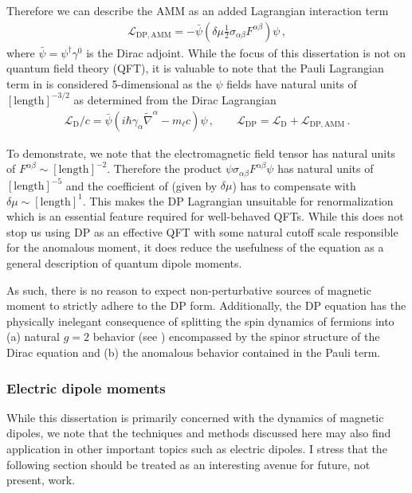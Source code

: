 Therefore we can describe the AMM as an added Lagrangian interaction term
\begin{gather}
    \label{lamm:1}
    \mathcal{L}_\mathrm{DP,AMM} = -{\bar\psi}\left(\delta\mu\frac{1}{2}\sigma_{\alpha\beta}F^{\alpha\beta}\right)\psi\,,
\end{gather}
where ${\bar\psi}=\psi^{\dagger}\gamma^{0}$ is the Dirac adjoint. While the focus of this dissertation is not on quantum field theory (QFT), it is valuable to note that the Pauli Lagrangian term in  is considered 5-dimensional as the $\psi$ fields have natural units of $[\mathrm{length}]^{-3/2}$ as determined from the Dirac Lagrangian
\begin{gather}
    \label{ld:1}
    \mathcal{L}_\mathrm{D}/c=\bar\psi\left(i\hbar\gamma_{\alpha}\widetilde\nabla^{\alpha}-m_{\ell}c\right)\psi\,,\qquad \mathcal{L}_\mathrm{DP} = \mathcal{L}_\mathrm{D} + \mathcal{L}_\mathrm{DP,AMM}\,.
\end{gather}

To demonstrate, we note that the electromagnetic field tensor has natural units of $F^{\alpha\beta}\sim[\mathrm{length}]^{-2}$. Therefore the product $\psi\sigma_{\alpha\beta}F^{\alpha\beta}\psi$ has natural units of $[\mathrm{length}]^{-5}$ and the coefficient of  (given by $\delta\mu$) has to compensate with $\delta\mu\sim[\mathrm{length}]^{1}$. This makes the DP Lagrangian unsuitable for renormalization which is an essential feature required for well-behaved QFTs. While this does not stop us using DP as an effective QFT with some natural cutoff scale responsible for the anomalous moment, it does reduce the usefulness of the equation as a general description of quantum dipole moments.

As such, there is no reason to expect non-perturbative sources of magnetic moment to strictly adhere to the DP form. Additionally, the DP equation has the physically inelegant consequence of splitting the spin dynamics of fermions into (a) natural $g\!=\!2$ behavior (see ) encompassed by the spinor structure of the Dirac equation and (b) the anomalous behavior contained in the Pauli term.

\subsubsection{Electric dipole moments}
\label{sec:edm}
\noindent While this dissertation is primarily concerned with the dynamics of magnetic dipoles, we note that the techniques and methods discussed here may also find application in other important topics such as electric dipoles. I stress that the following section should be treated as an interesting avenue for future, not present, work.

